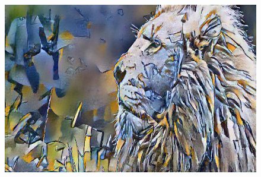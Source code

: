 \documentclass[17pt]{extarticle}
\begin{document}
\begin{figure}
  \includegraphics[scale=0.7]{lionphoenix.png}
\end{figure}
\newpage
\end{document}
